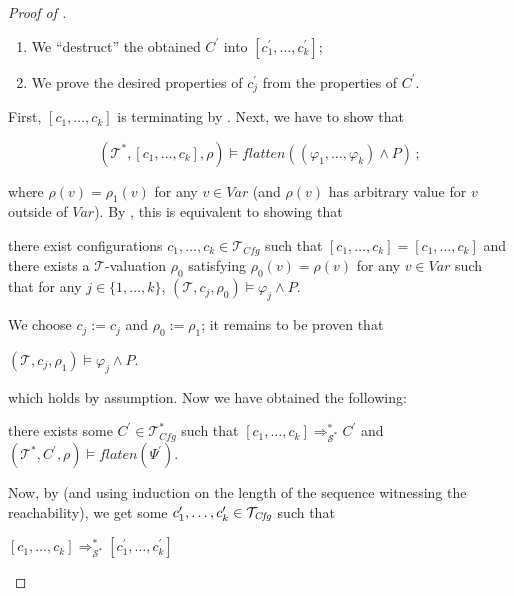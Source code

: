 \begin{proof}[Proof of ]
\begin{enumerate}
\begin{enumerate}
\begin{enumerate}
        \end{enumerate}
        \item We ``destruct'' the obtained $C^\prime$ into $[c^\prime_1,\ldots,c^\prime_k]$;
        \item We prove the desired properties of $c^\prime_j$ from the properties of $C^\prime$.
    \end{enumerate}
    First, $[c_1,\ldots,c_k]$ is terminating by .
    Next, we have to show that
    \begin{proofenv}
        \begin{equation*}
            (\mathcal{T}^*, [c_1,\ldots,c_k], \rho) \vDash \mathit{flatten}((\varphi_1,\ldots,\varphi_k) \land P) \, ;
        \end{equation*}
    \end{proofenv}
    where $\rho(v) = \rho_1(v)$ for any $v \in \mathit{Var}$ (and $\rho(v)$ has arbitrary value for $v$ outside of $\mathit{Var}$).
    By , this is equivalent to showing that
    \begin{proofenv}
        there exist configurations $c_1, \ldots, c_k \in \mathcal{T}_{\mathit{Cfg}}$ such that
        $[c_1, \ldots, c_k] = [c_1, \ldots, c_k]$ and there exists a $\mathcal{T}$-valuation $\rho_0$
        satisfying $\rho_0(v) = \rho(v)$ for any $v \in \mathit{Var}$
        such that for any $j \in \{ 1, \ldots, k \}$, $(\mathcal{T}, c_j, \rho_0) \vDash \varphi_j \land P$.
    \end{proofenv}
    We choose $c_j := c_j$ and $\rho_0 := \rho_1$; it remains to be proven that
    \begin{proofenv}
        $(\mathcal{T}, c_j, \rho_1) \vDash \varphi_j \land P$.    
    \end{proofenv}
    which holds by assumption.
    Now we have obtained the following:
    \begin{proofenv}
        there exists some $C^\prime \in \mathcal{T}_{\mathit{Cfg}}^*$ such that
        $[c_1,\ldots,c_k] \Rightarrow_{\mathcal{S}^*}^* C^\prime$
        and $(\mathcal{T}^*, C^\prime, \rho) \vDash \mathit{flaten}(\Psi^\prime)$.
    \end{proofenv}
    Now, by  (and using induction on the length of the
    sequence witnessing the reachability),
    we get some $c^\prime_1,\ldots,c^\prime_k \in \mathcal{T}_{\mathit{Cfg}}$ such that
    \begin{proofenv}
        $[c_1,\ldots,c_k] \Rightarrow_{\mathcal{S}^*}^* [c^\prime_1,\ldots,c^\prime_k]$

\end{proofenv}
\end{enumerate}
\end{proof}
